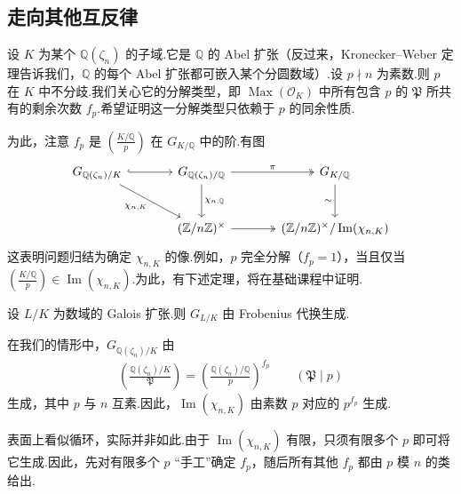 \subsection{走向其他互反律}\label{sec:nt-3-5-8}
设 $K$ 为某个 $\mathbb Q(\zeta_n)$ 的子域.它是 $\mathbb Q$ 的 Abel 扩张（反过来，Kronecker--Weber 定理告诉我们，$\mathbb Q$ 的每个 Abel 扩张都可嵌入某个分圆数域）.设 $p\nmid n$ 为素数.则 $p$ 在 $K$ 中不分歧.我们关心它的分解类型，即 $\operatorname{Max}(\mathcal O_K)$ 中所有包含 $p$ 的 $\mathfrak P$ 所共有的剩余次数 $f_p$.希望证明这一分解类型只依赖于 $p$ 的同余性质.

为此，注意 $f_p$ 是 $\left(\frac{K/\mathbb Q}{p}\right)$ 在 $G_{K/\mathbb Q}$ 中的阶.有图
\begin{align*}
\begin{tikzcd}[ampersand replacement=\&,column sep=large,row sep=large]
G_{\mathbb Q(\zeta_n)/K}\arrow[r,hook]\arrow[dr,"\chi_{n,K}"']\&G_{\mathbb Q(\zeta_n)/\mathbb Q}\arrow[r,two heads,"\pi"]\arrow[d,"\chi_{n,\mathbb Q}"]\&G_{K/\mathbb Q}\arrow[d,"\sim"']\\
\&(\mathbb Z/n\mathbb Z)^\times\arrow[r,two heads]\&(\mathbb Z/n\mathbb Z)^\times/\operatorname{Im}(\chi_{n,K})
\end{tikzcd}
\end{align*}
这表明问题归结为确定 $\chi_{n,K}$ 的像.例如，$p$ 完全分解（$f_p=1$），当且仅当 $\left(\frac{K/\mathbb Q}{p}\right)\in\operatorname{Im}(\chi_{n,K})$.为此，有下述定理，将在基础课程中证明.
\begin{theorem*}
设 $L/K$ 为数域的 Galois 扩张.则 $G_{L/K}$ 由 Frobenius 代换生成.
\end{theorem*}
在我们的情形中，$G_{\mathbb Q(\zeta_n)/K}$ 由
\begin{align*}
\left(\frac{\mathbb Q(\zeta_n)/K}{\mathfrak P}\right)
=\left(\frac{\mathbb Q(\zeta_n)/\mathbb Q}{p}\right)^{f_p}\qquad(\mathfrak P\mid p)
\end{align*}
生成，其中 $p$ 与 $n$ 互素.因此，$\operatorname{Im}(\chi_{n,K})$ 由素数 $p$ 对应的 $p^{f_p}$ 生成.

表面上看似循环，实际并非如此.由于 $\operatorname{Im}(\chi_{n,K})$ 有限，只须有限多个 $p$ 即可将它生成.因此，先对有限多个 $p$ ``手工''确定 $f_p$，随后所有其他 $f_p$ 都由 $p$ 模 $n$ 的类给出.
